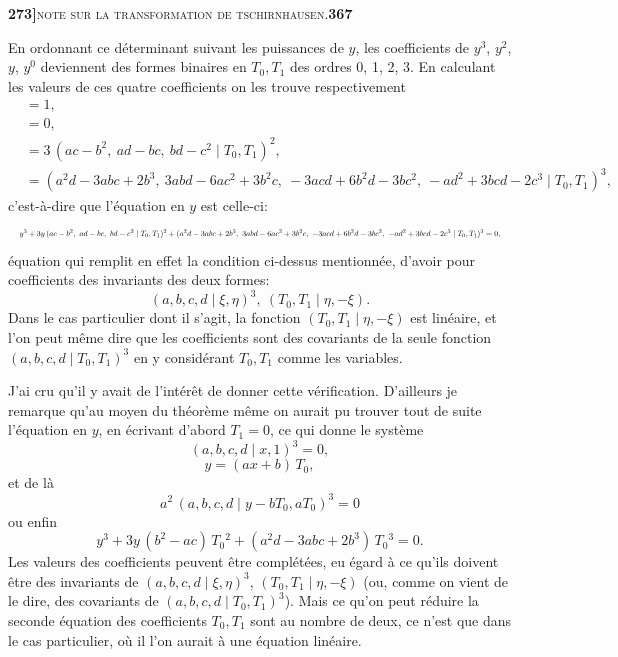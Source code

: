 \documentclass[11pt]{article}
\newcommand{\Cdel}{\mid}
\begin{document}
\newpage
\noindent\textbf{273]}\hfill\textsc{note sur la transformation de tschirnhausen.}\hfill\textbf{367}

\medskip

\noindent En ordonnant ce d\'eterminant suivant les puissances de $y$, les coefficients de $y^3$, $y^2$, $y$, $y^0$ deviennent des formes binaires en $T_0, T_1$ des ordres 0, 1, 2, 3. En calculant les valeurs de ces quatre coefficients on les trouve respectivement
\[
\begin{aligned}
&= 1,\\
&= 0,\\
&= 3\,(ac - b^2,\ ad - bc,\ bd - c^2 \Cdel T_0, T_1)^2,\\
&= (a^2 d - 3 a b c + 2 b^3,\ 3 a b d - 6 a c^2 + 3 b^2 c,\ -3 a c d + 6 b^2 d - 3 b c^2,\ -a d^2 + 3 b c d - 2 c^3 \Cdel T_0, T_1)^3,
\end{aligned}
\]
c'est-\`a-dire que l'\'equation en $y$ est celle-ci:
\[
\resizebox{\textwidth}{!}{$\displaystyle
y^3 + 3 y\,(a c - b^2,\ a d - b c,\ b d - c^2 \Cdel T_0, T_1)^2 + (a^2 d - 3 a b c + 2 b^3,\ 3 a b d - 6 a c^2 + 3 b^2 c,\ -3 a c d + 6 b^2 d - 3 b c^2,\ -a d^2 + 3 b c d - 2 c^3 \Cdel T_0, T_1)^3 = 0,
$}
\]
\'equation qui remplit en effet la condition ci-dessus mentionn\'ee, d'avoir pour coefficients des invariants des deux formes:
\[
(a, b, c, d \Cdel \xi, \eta)^3,\ (T_0, T_1 \Cdel \eta, -\xi).
\]
Dans le cas particulier dont il s'agit, la fonction $(T_0, T_1 \Cdel \eta, -\xi)$ est lin\'eaire, et l'on peut m\^eme dire que les coefficients sont des covariants de la seule fonction $(a, b, c, d \Cdel T_0, T_1)^3$ en y consid\'erant $T_0, T_1$ comme les variables.

\medskip

J'ai cru qu'il y avait de l'int\'er\^et de donner cette v\'erification. D'ailleurs je remarque qu'au moyen du th\'eor\`eme m\^eme on aurait pu trouver tout de suite l'\'equation en $y$, en \'ecrivant d'abord $T_1 = 0$, ce qui donne le syst\`eme
\[
(a, b, c, d \Cdel x, 1)^3 = 0,
\]
\[
y = (a x + b)\, T_0,
\]
et de l\`a
\[
a^2\,(a, b, c, d \Cdel y - b T_0, a T_0)^3 = 0
\]
ou enfin
\[
y^3 + 3 y\,(b^2 - a c)\, T_0{}^2 + (a^2 d - 3 a b c + 2 b^3)\, T_0{}^3 = 0.
\]
Les valeurs des coefficients peuvent \^etre compl\'et\'ees, eu \'egard \`a ce qu'ils doivent \^etre des invariants de $(a, b, c, d \Cdel \xi, \eta)^3$, $(T_0, T_1 \Cdel \eta, -\xi)$ (ou, comme on vient de le dire, des covariants de $(a, b, c, d \Cdel T_0, T_1)^3$). Mais ce qu'on peut r\'eduire la seconde \'equation des coefficients $T_0, T_1$ sont au nombre de deux, ce n'est que dans le cas particulier, o\`u il l'on aurait \`a une \'equation lin\'eaire.
\end{document}
